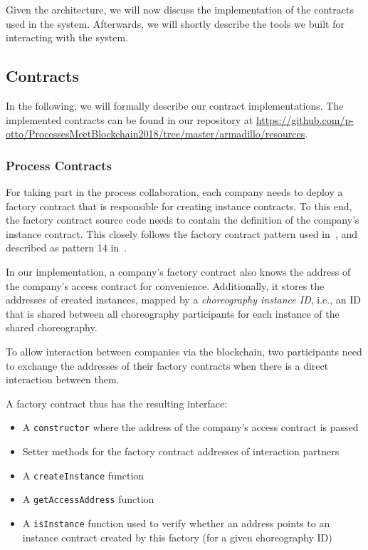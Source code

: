 \documentclass[runningheads]{llncs}
\begin{document}
Given the architecture, we will now discuss the implementation of the contracts used in the system.
Afterwards, we will shortly describe the tools we built for interacting with the system.

\subsection{Contracts}

In the following, we will formally describe our contract implementations.
The implemented contracts can be found in our repository at \url{https://github.com/p-otto/ProcessesMeetBlockchain2018/tree/master/armadillo/resources}.

\subsubsection{Process Contracts}

For taking part in the process collaboration, each company needs to deploy a factory contract that is responsible for creating instance contracts.
To this end, the factory contract source code needs to contain the definition of the company's instance contract.
This closely follows the factory contract pattern used in~\cite{weber2016untrusted}, and described as pattern 14 in~\cite{xu2018pattern}.

In our implementation, a company's factory contract also knows the address of the company's access contract for convenience.
Additionally, it stores the addresses of created instances, mapped by a \emph{choreography instance ID}, i.e., an ID that is shared between all choreography participants for each instance of the shared choreography.

To allow interaction between companies via the blockchain, two participants need to exchange the addresses of their factory contracts when there is a direct interaction between them.

A factory contract thus has the resulting interface:
\begin{itemize}
	\item A \texttt{constructor} where the address of the company's access contract is passed
	\item Setter methods for the factory contract addresses of interaction partners
	\item A \texttt{createInstance} function
	\item A \texttt{getAccessAddress} function
	\item A \texttt{isInstance} function used to verify whether an address points to an instance contract created by this factory (for a given choreography ID)
\end{itemize}
\end{document}
